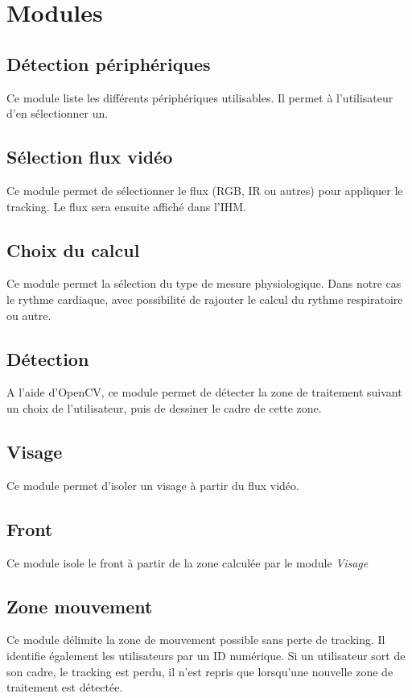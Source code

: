 \documentclass[12pt,a4paper]{article}
\begin{document}
\section*{Modules}

\subsection*{Détection périphériques}
Ce module liste les différents périphériques utilisables. Il permet à l'utilisateur d'en sélectionner un.

\subsection*{Sélection flux vidéo}

Ce module permet de sélectionner le flux (RGB, IR ou autres) pour appliquer le tracking. Le flux sera ensuite affiché dans l'IHM.

\subsection*{Choix du calcul}
Ce module permet la sélection du type de mesure physiologique. Dans notre cas le rythme cardiaque, avec possibilité de rajouter le calcul du rythme respiratoire ou autre.

\subsection*{Détection}
A l'aide d'OpenCV, ce module permet de détecter la zone de traitement suivant un choix de l'utilisateur, puis de dessiner le cadre de cette zone.

\subsection*{Visage}
Ce module permet d'isoler un visage à partir du flux vidéo.

\subsection*{Front}
Ce module isole le front à partir de la zone calculée par le module \textit{Visage}

\subsection*{Zone mouvement}

Ce module délimite la zone de mouvement possible sans perte de tracking. Il identifie également les utilisateurs par un ID numérique. Si un utilisateur sort de son cadre, le tracking est perdu, il n'est repris que lorsqu'une nouvelle zone de traitement est détectée.
\end{document}
